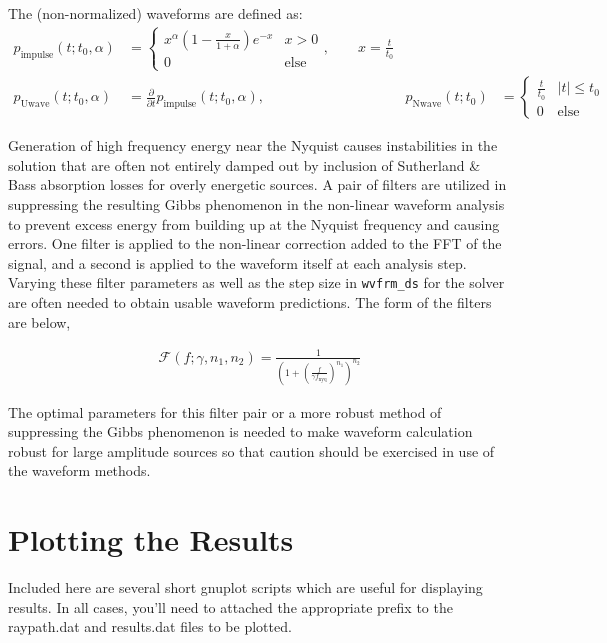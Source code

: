 \documentclass[10pt]{article}
\begin{document}
\noindent The (non-normalized) waveforms are defined as:
\begin{align*}
 p_\text{impulse} \left( t; t_0, \alpha \right) & = \left\{ 
 \begin{matrix}
 x^\alpha \left( 1 - \frac{x}{1 + \alpha} \right) e^{-x}  & x > 0 \\
 0 & \text{else} 
 \end{matrix}
 \right., \quad \quad x = \frac{t}{t_0} \\
 p_\text{Uwave} \left( t; t_0, \alpha \right) & = \frac{\partial}{\partial t} p_\text{impulse} \left( t; t_0, \alpha \right), \quad \quad & 
 p_\text{Nwave} \left( t; t_0 \right)  & = \left\{ 
 \begin{matrix}
 \frac{t}{t_0}  	& | t |  \leq t_0 \\
 0 			& \text{else} 
 \end{matrix}
 \right.
 \end{align*}

Generation of high frequency energy near the Nyquist causes instabilities in the solution that are often not entirely damped out by inclusion of Sutherland \& Bass absorption losses for overly energetic sources.  A pair of filters are utilized in suppressing the resulting Gibbs phenomenon in the non-linear waveform analysis to prevent excess energy from building up at the Nyquist frequency and causing errors.  One filter is applied to the non-linear correction added to the FFT of the signal, and a second is applied to the waveform itself at each analysis step.  Varying these filter parameters as well as the step size in \verb=wvfrm_ds= for the solver are often needed to obtain usable waveform predictions.  The form of the filters are below,

\begin{align*}
 \mathcal{F} \left( f; \gamma, n_1, n_2  \right) = \frac{1}{\left( 1 + \left( \frac{f}{\gamma f_\text{nyq}} \right)^{n_1} \right)^{n_2}}
\end{align*}

The optimal parameters for this filter pair or a more robust method of suppressing the Gibbs phenomenon is needed to make waveform calculation robust for large amplitude sources so that caution should be exercised in use of the waveform methods.

\newpage
\section{Plotting the Results}
Included here are several short gnuplot scripts which are useful for displaying results.  In all cases, you'll need to attached the appropriate prefix to the raypath.dat and results.dat files to be plotted. \newline
\end{document}
